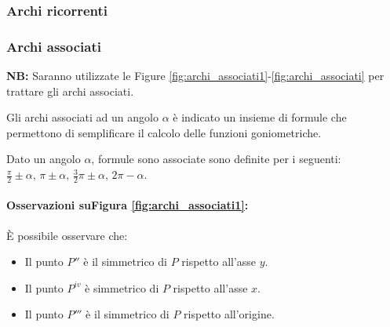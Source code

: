 \subsubsection{Archi ricorrenti}

\subsubsection{Archi associati}

\textbf{NB:} Saranno utilizzate le Figure \ref{fig:archi_associati1}-\ref{fig:archi_associati} per trattare gli archi associati.

Gli archi associati ad un angolo $\alpha$ è indicato un insieme di formule che permettono di semplificare il calcolo delle funzioni goniometriche.

\begin{definition}
    Dato un angolo $\alpha$, formule sono associate sono definite per i seguenti: $\frac{\pi}{2}\pm\alpha,\, \pi \pm \alpha,\, \frac{3}{2}\pi\pm\alpha,\, 2\pi - \alpha$.
\end{definition}

\paragraph{Osservazioni suFigura \ref{fig:archi_associati1}:} È possibile osservare che:
\begin{itemize}
    \item Il punto $P''$ è il simmetrico di $P$ rispetto all'asse $y$.
    \item Il punto $P^{iv}$ è simmetrico di $P$ rispetto all'asse $x$.
    \item Il punto $P'''$ è il simmetrico di $P$ rispetto all'origine.
\end{itemize}


